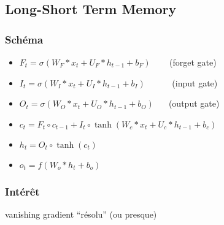 \subsection{Long-Short Term Memory}

\begin{frame}
  \frametitle{Schéma}
  \begin{itemize}
  \item $F_{t}=\sigma (W_{F}*x_{t}+U_{F}*h_{t-1}+b_{F})\;\;\;\;\;\;\,$ (forget gate)
  \item $I_{t} =\sigma (W_{I}*x_{t}+U_{I}*h_{t-1}+b_{I})\;\;\;\;\;\;\;\;\;\;$ (input gate)
  \item $O_{t} =\sigma (W_{O}*x_{t}+U_{O}*h_{t-1}+b_{O})\;\;\;\;\;$ (output gate)
  \item $c_{t} =F_{t}\circ c_{t-1}+I_{t}\circ \tanh(W_{c}*x_{t}+U_{c}*h_{t-1}+b_{c})$
  \item $h_{t} =O_{t}\circ \tanh(c_{t})$
  \item $o_{t} =f(W_{o}*h_{t}+b_{o})$
  \end{itemize}
\end{frame}

\begin{frame}
  \frametitle{Intérêt}
  vanishing gradient ``résolu'' (ou presque)
\end{frame}

